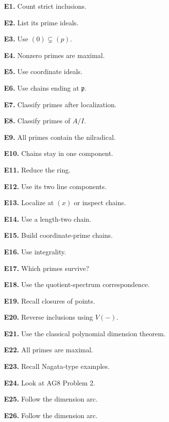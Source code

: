 \textbf{E1.} Count strict inclusions.\par

\textbf{E2.} List its prime ideals.\par

\textbf{E3.} Use $(0)\subsetneq(p)$.\par

\textbf{E4.} Nonzero primes are maximal.\par

\textbf{E5.} Use coordinate ideals.\par

\textbf{E6.} Use chains ending at $\mathfrak p$.\par

\textbf{E7.} Classify primes after localization.\par

\textbf{E8.} Classify primes of $A/I$.\par

\textbf{E9.} All primes contain the nilradical.\par

\textbf{E10.} Chains stay in one component.\par

\textbf{E11.} Reduce the ring.\par

\textbf{E12.} Use its two line components.\par

\textbf{E13.} Localize at $(x)$ or inspect chains.\par

\textbf{E14.} Use a length-two chain.\par

\textbf{E15.} Build coordinate-prime chains.\par

\textbf{E16.} Use integrality.\par

\textbf{E17.} Which primes survive?\par

\textbf{E18.} Use the quotient-spectrum correspondence.\par

\textbf{E19.} Recall closures of points.\par

\textbf{E20.} Reverse inclusions using $V(-)$.\par

\textbf{E21.} Use the classical polynomial dimension theorem.\par

\textbf{E22.} All primes are maximal.\par

\textbf{E23.} Recall Nagata-type examples.\par

\textbf{E24.} Look at AG8 Problem 2.\par

\textbf{E25.} Follow the dimension arc.\par

\textbf{E26.} Follow the dimension arc.\par
